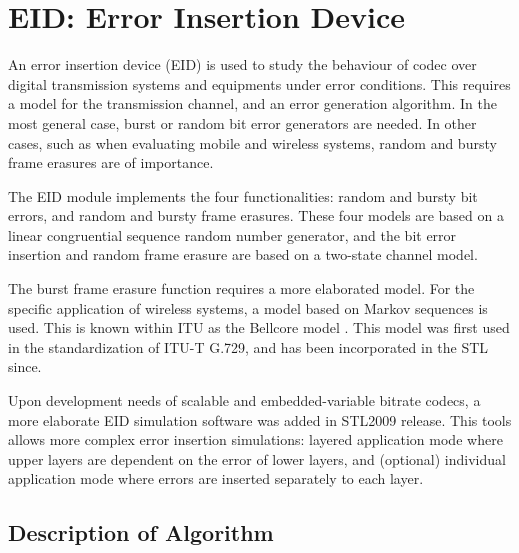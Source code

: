 
\chapter{EID: Error Insertion Device}

An error insertion device (EID) is used to study the behaviour of
codec over digital transmission systems and equipments under error
conditions. This requires a model for the transmission channel, and an
error generation algorithm. In the most general case, burst or random
bit error generators are needed. In other cases, such as when
evaluating mobile and wireless systems, random and bursty frame
erasures are of importance.

The EID module implements the four functionalities: random and bursty
bit errors, and random and bursty frame erasures. These four models
are based on a linear congruential sequence random number generator,
and the bit error insertion and random frame erasure are based on a
two-state channel model.

The burst frame erasure function requires a more elaborated model. For
the specific application of wireless systems, a model based on Markov
sequences is used. This is known within ITU as the Bellcore model
\cite{Bellcore-Model-1,Bellcore-Model-2}. This model was first used in
the standardization of ITU-T G.729, and has been incorporated in the
STL since.

Upon development needs of scalable and embedded-variable bitrate
codecs, a more elaborate EID simulation software was added in STL2009
release. This tools allows more complex error insertion simulations:
layered application mode where upper layers are dependent on the error
of lower layers, and (optional) individual application mode where
errors are inserted separately to each layer. 

\section{Description of Algorithm}

